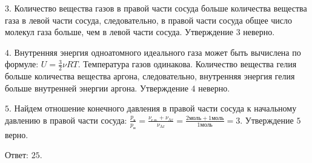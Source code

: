 \documentclass[12pt,a4paper]{article}
\begin{document}
{$3$. Количество вещества газов в правой части сосуда больше количества вещества газа в левой части сосуда, следовательно, в правой части сосуда общее число молекул газа больше, чем в левой части сосуда. Утверждение $3$ неверно.

$4$. Внутренняя энергия одноатомного идеального газа может быть вычислена по формуле: $U = \frac{3}{2} \nu RT.$ Температура газов одинакова. Количество вещества гелия больше количества вещества аргона, следовательно, внутренняя энергия гелия больше внутренней энергии аргона. Утверждение $4$ неверно.

$5$. Найдем отношение конечного давления в правой части сосуда к начальному давлению в правой части сосуда: $\frac{p_{\text{к}}}{p_{\text{н}}} = \frac{\nu_{\text{г.п.}} + \nu_{\mathrm{Ar}}}{\nu_{\mathrm{Ar}}} = \frac{2\text{моль} + 1\text{моль}}{1\text{моль}} = 3.$ Утверждение $5$ верно.

Ответ: $25$.
}
\end{document}

